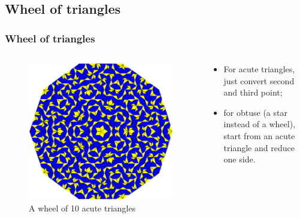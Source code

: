 \documentclass{beamer}
\begin{document}
	\subsection{Wheel of triangles}
	\begin{frame}
		\frametitle{Wheel of triangles}
		\begin{columns}[T]
			\begin{column}{.43\textwidth}
				\hspace{-2cm}
				\vspace{-0.7cm}
				\begin{figure}[H]
					\caption{A wheel of 10 acute triangles}	\includegraphics[height=0.65\textheight]{screenshot_wheel.png}
				\end{figure}
				\hspace*{\fill}
			\end{column}
			\begin{column}{.57\textwidth}
				\begin{itemize}
					\item For acute triangles, just convert second and third point;
					\item for obtuse (a star instead of a wheel), start from an acute triangle and reduce one side.
				\end{itemize}
			\end{column}
		\end{columns}
	\end{frame}
	
\end{document}
